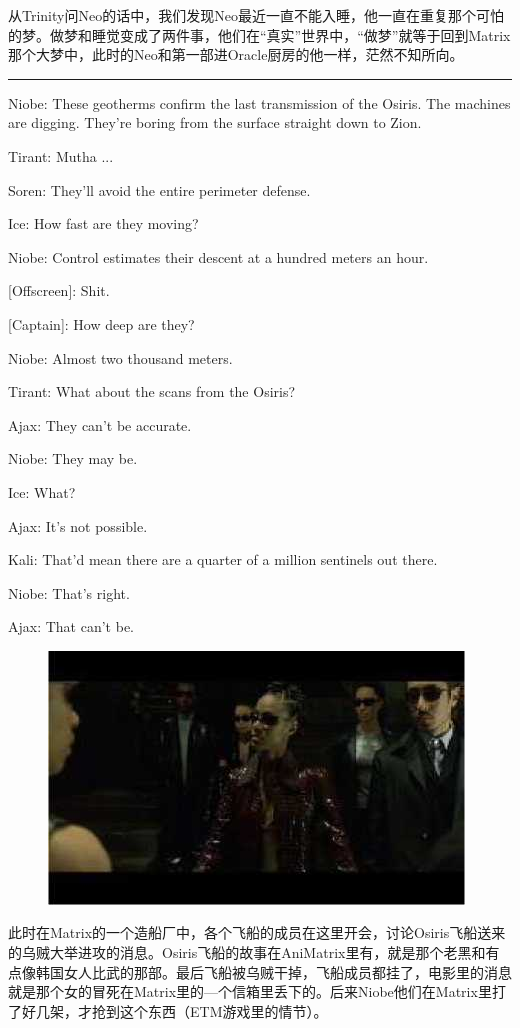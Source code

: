 \documentclass{ctexart}
\newcommand{\myparsep}{\noindent \rule[0.5ex]{\linewidth}{1pt}}
\newenvironment{myquote}{\color{green} \setlength{\leftskip}{6em} \setlength{\rightskip}{4em} \setlength{\parindent}{-2em}}{\par}
\begin{document}
从Trinity问Neo的话中，我们发现Neo最近一直不能入睡，他一直在重复那个可怕的梦。做梦和睡觉变成了两件事，他们在“真实”世界中，“做梦”就等于回到Matrix那个大梦中，此时的Neo和第一部进Oracle厨房的他一样，茫然不知所向。

\myparsep

\begin{myquote}
Niobe: These geotherms confirm the last transmission of the Osiris. The machines are digging. They're boring from the surface straight down to Zion.

Tirant: Mutha ...

Soren: They'll avoid the entire perimeter defense.

Ice: How fast are they moving?

Niobe: Control estimates their descent at a hundred meters an hour.

[Offscreen]: Shit.

[Captain]: How deep are they?

Niobe: Almost two thousand meters.

Tirant: What about the scans from the Osiris?

Ajax: They can't be accurate.

Niobe: They may be.

Ice: What?

Ajax: It's not possible.

Kali: That'd mean there are a quarter of a million sentinels out there.

Niobe: That's right.

Ajax: That can't be.
\end{myquote}

\begin{figure}[htb]
\centering
\includegraphics[width=0.5\linewidth]{fig/read_reloaded-15}
\end{figure}

此时在Matrix的一个造船厂中，各个飞船的成员在这里开会，讨论Osiris飞船送来的乌贼大举进攻的消息。Osiris飞船的故事在AniMatrix里有，就是那个老黑和有点像韩国女人比武的那部。最后飞船被乌贼干掉，飞船成员都挂了，电影里的消息就是那个女的冒死在Matrix里的—个信箱里丢下的。后来Niobe他们在Matrix里打了好几架，才抢到这个东西（ETM游戏里的情节）。
\end{document}
